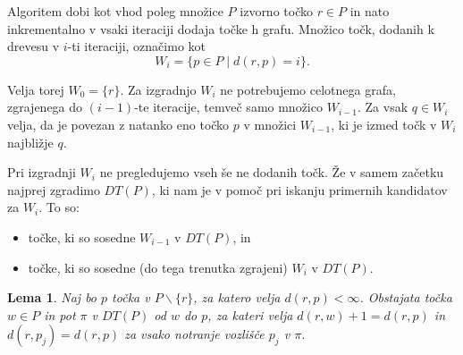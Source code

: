 \documentclass[a4paper, 12pt]{book}
\newtheorem{lema}[izrek]{Lema}
\begin{document}
Algoritem dobi kot vhod poleg množice $P$ izvorno točko $r\in P$ in nato inkrementalno v vsaki iteraciji dodaja točke h grafu. Množico točk, dodanih k drevesu v $i$-ti iteraciji, označimo kot
\[	W_i = \{ p\in P \mid d(r,p) = i\}.
	\]

Velja torej $W_0 = \{r\}$. Za izgradnjo $W_i$ ne potrebujemo celotnega grafa, zgrajenega do $(i-1)$-te iteracije, temveč samo množico $W_{i-1}$.  Za vsak $q\in W_i$ velja, da je povezan z natanko eno točko $p$ v množici $W_{i-1}$,  ki je izmed točk v $W_i$ najbližje $q$.

Pri izgradnji $W_i$ ne pregledujemo vseh še ne dodanih točk. Že v samem začetku najprej zgradimo $DT(P)$, ki nam je v pomoč pri iskanju primernih kandidatov za $W_i$. To so:

\begin{itemize}
\item točke, ki so sosedne $W_{i-1}$ v $DT(P)$, in
\item točke, ki so sosedne (do tega trenutka zgrajeni) $W_i$ v $DT(P)$.
\end{itemize} 

\begin{lema}
\label{lema1}
Naj bo $p$ točka v $P\backslash \{r\}$, za katero velja $d(r,p) < \infty$. Obstajata točka $w\in P$ in pot $\pi$ v $DT(P)$ od $w$ do $p$, za kateri velja $d(r,w)+1 = d(r,p)$ in $d(r,p_j) = d(r,p)$ za vsako notranje vozlišče $p_j$ v $\pi$.
\end{lema}
\end{document}
